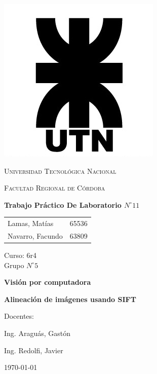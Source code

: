 \documentclass[11pt, a4paper]{article}
\begin{document}
\begin{titlepage}
 \centering
	\includegraphics[scale=0.80]{Imagenes/LOGO.jpg} \par
 	\vspace{1cm}
 	{\scshape\LARGE Universidad Tecnológica Nacional \par}
 	{\scshape\large Facultad Regional de Córdoba \par}
 	\vspace{1cm}
	{\bfseries \Large Trabajo Práctico De Laboratorio $N^{\circ} 11$\par}
 	\vspace{1.5cm}

	\begin{tabular}{ll}
		Lamas, Matías		&	65536 	\\
		Navarro, Facundo	&	63809
	\end{tabular}
	
	\vspace{1cm}
	Curso: 6r4 \\
	Grupo $N^{\circ} 5$
 	\vfill
	{\bfseries \LARGE Visión por computadora\par}
	{\bfseries \Large Alineación de imágenes usando SIFT\par}
	\vspace{1.5cm}
	Docentes: \par
	Ing. Araguás, Gastón \par
	Ing. Redolfi, Javier \par

 	\vfill
	{\large \today\par}
\end{titlepage}
	
	
\tableofcontents
\clearpage
\end{document}
